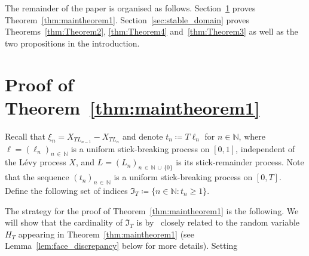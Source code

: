 \documentclass[10pt]{amsart}
\theoremstyle{definition}\newtheorem{defi}[theo]{Definition}\newtheorem{rema}[theo]{Remark}\newtheorem{exam}[theo]{Example}\newtheorem{exem}[theo]{Example}\newtheorem{nota}[theo]{Notation}
\newcommand\N{\mathbb{N}}
\newcommand\1{\mathds{1}}
\newcommand\GI{\mathfrak{I}}
\begin{document}
The remainder of the paper is organised as follows. Section~\ref{sec:Proof_Thm1} proves Theorem~\ref{thm:maintheorem1}. Section~\ref{sec:stable_domain} proves Theorems~\ref{thm:Theorem2}, \ref{thm:Theorem4} and~\ref{thm:Theorem3} as well as the two propositions in the introduction.

\section{Proof of Theorem~\ref{thm:maintheorem1}}\label{sec:Proof_Thm1}

Recall that $\xi_n= X_{TL_{n-1}}-X_{TL_n}$ and denote $t_n\coloneqq T\ell_n$ for $n\in\N$, where $\ell=(\ell_n)_{n\,\in\,\N}$ is a uniform stick-breaking process on $[0,1]$, independent of the Lévy process $X$, and $L=(L_n)_{n\,\in\,\N\,\cup\,\{0\}}$ is its stick-remainder process. Note that the sequence $(t_n)_{n\,\in\,\N}$ is a uniform stick-breaking process on $[0,T]$. Define the following set of indices $\GI_T\coloneqq \{n\in\N:t_n\ge 1\}$.

The strategy for the proof of Theorem~\ref{thm:maintheorem1} is the following. We will show that the cardinality of $\GI_T$ is by~\cite[Theorem~11]{CM_Fluctuation_Levy} closely related to the random variable $H_T$ appearing in Theorem~\ref{thm:maintheorem1} (see Lemma~\ref{lem:face_discrepancy} below for more details). Setting
\end{document}
